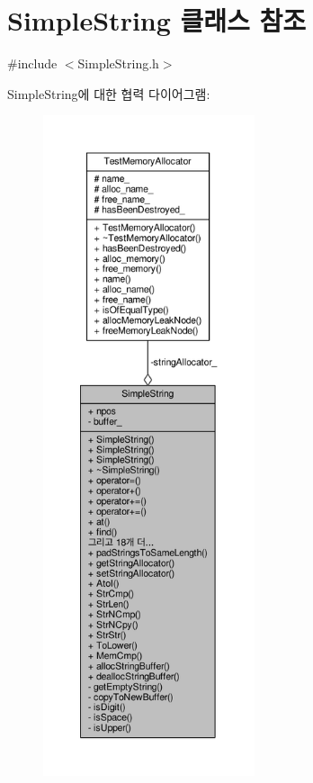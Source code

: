\hypertarget{class_simple_string}{}\section{Simple\+String 클래스 참조}
\label{class_simple_string}


{\ttfamily \#include $<$Simple\+String.\+h$>$}



Simple\+String에 대한 협력 다이어그램\+:
\nopagebreak
\begin{figure}[H]
\begin{center}
\leavevmode
\includegraphics[height=550pt]{class_simple_string__coll__graph}
\end{center}
\end{figure}
